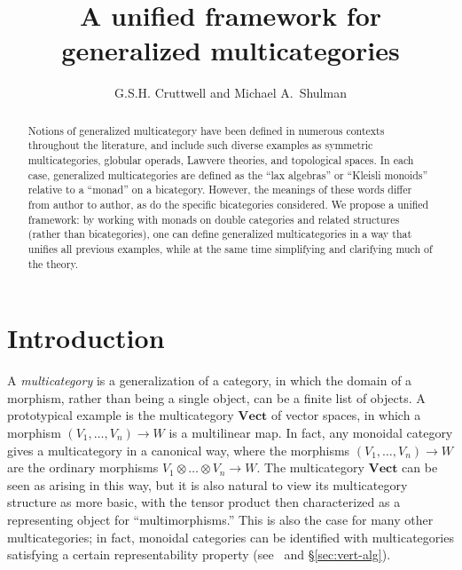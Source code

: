\documentclass{tac}
\author {G.S.H. Cruttwell and Michael A.\ Shulman}
\title {A unified framework for generalized multicategories}
\makeatletter
\newcommand{\ten}{\otimes}
\numberwithin{equation}{section}
\def\currthmtype{}
\let\old@label\label
\def\label#1{%
    {\let\your@currentlabel\@currentlabel%
      \edef\@currentlabel{\currthmtype}%
      \old@label{label@name@#1}}%
    \old@label{#1}}
\makeatother
\begin{document}
\maketitle
\begin{abstract}
  Notions of generalized multicategory have been defined in numerous
  contexts throughout the literature, and include such diverse
  examples as symmetric multicategories, globular operads, Lawvere
  theories, and topological spaces.  In each case, generalized
  multicategories are defined as the ``lax algebras'' or ``Kleisli
  monoids'' relative to a ``monad'' on a bicategory.
  However, the meanings of these words differ from author to author,
  as do the specific bicategories considered.  We propose a unified
  framework: by working with monads on double categories and related
  structures (rather than bicategories), one can define generalized
  multicategories in a way that unifies all previous examples, while
  at the same time simplifying and clarifying much of the theory.
\end{abstract}

\tableofcontents


\section{Introduction}
\label{sec:introduction}

A \emph{multicategory} is a generalization of a category, in which the
domain of a morphism, rather than being a single object, can be a
finite list of objects.  A proto\-typical example is the
multicategory $\mathbf{Vect}$ of vector spaces, in which a morphism
$(V_1,\dots,V_n)\to W$ is a multilinear map.  In fact, any monoidal
category gives a multicategory in a canonical way, where the morphisms
$(V_1,\dots,V_n)\to W$ are the ordinary morphisms $V_1\ten\dots\ten
V_n\to W$.  The multicategory $\mathbf{Vect}$ can be seen as arising
in this way, but it is also natural to
view its multicategory structure as more basic, with the tensor product then
characterized as a representing object for ``multimorphisms.''
This is also the case for many other multicategories; in fact,
monoidal categories can be identified with multicategories
satisfying a certain representability property
(see~\cite{HermidaRepresentable} and \S\ref{sec:vert-alg}).
\end{document}
